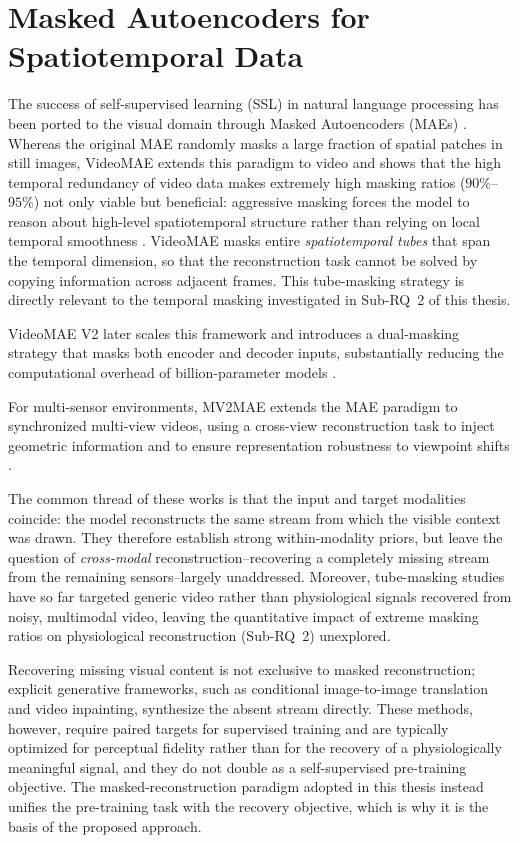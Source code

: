 \section{Masked Autoencoders for Spatiotemporal Data}
\label{sec:rw-mae}
The success of self-supervised learning (SSL) in natural language processing has
been ported to the visual domain through Masked Autoencoders (MAEs)
\cite{he2022masked}. Whereas the original MAE randomly masks a large fraction of
spatial patches in still images, VideoMAE extends this paradigm to video and
shows that the high temporal redundancy of video data makes extremely high
masking ratios ($90\%$--$95\%$) not only viable but beneficial: aggressive
masking forces the model to reason about high-level spatiotemporal structure
rather than relying on local temporal smoothness \cite{tong2022videomae}. 
VideoMAE masks entire \emph{spatiotemporal tubes} that span the temporal dimension, 
so that the reconstruction task cannot be solved by copying information across adjacent frames. 
This tube-masking strategy is directly relevant to the temporal masking investigated in Sub-RQ~2 of this thesis. 

VideoMAE V2 later scales this framework and introduces a dual-masking strategy that masks both encoder
and decoder inputs, substantially reducing the computational overhead of billion-parameter models \cite{wang2023videomaev2}. 

For multi-sensor environments, MV2MAE extends the MAE paradigm to synchronized multi-view videos,
using a cross-view reconstruction task to inject geometric information and to
ensure representation robustness to viewpoint shifts \cite{shah2024mv2mae}.

The common thread of these works is that the input and target modalities
coincide: the model reconstructs the same stream from which the visible context
was drawn. They therefore establish strong within-modality priors, but leave the
question of \emph{cross-modal} reconstruction--recovering a completely missing
stream from the remaining sensors--largely unaddressed. Moreover, tube-masking
studies have so far targeted generic video rather than physiological signals
recovered from noisy, multimodal video, leaving the quantitative impact of
extreme masking ratios on physiological reconstruction (Sub-RQ~2) unexplored.

Recovering missing visual content is not exclusive to masked reconstruction;
explicit generative frameworks, such as conditional image-to-image translation
\cite{isola2017pix2pix} and video inpainting, synthesize the absent stream
directly. These methods, however, require paired targets for supervised training
and are typically optimized for perceptual fidelity rather than for the recovery
of a physiologically meaningful signal, and they do not double as a
self-supervised pre-training objective. The masked-reconstruction paradigm
adopted in this thesis instead unifies the pre-training task with the recovery
objective, which is why it is the basis of the proposed approach.

